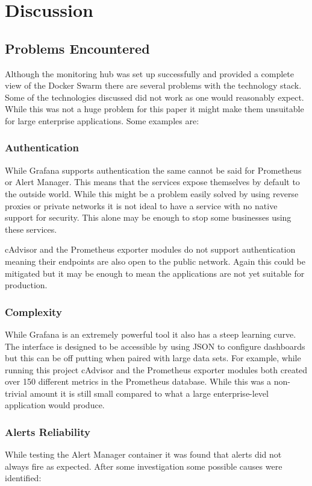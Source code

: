 \section{Discussion}
\label{sec:discussion}

\subsection{Problems Encountered}
Although the monitoring hub was set up successfully and provided a complete view of the Docker Swarm there are several problems with the technology stack. Some of the technologies discussed did not work as one would reasonably expect. While this was not a huge problem for this paper it might make them unsuitable for large enterprise applications. Some examples are:

\subsubsection{Authentication}
While Grafana supports authentication the same cannot be said for Prometheus or Alert Manager. This means that the services expose themselves by default to the outside world. While this might be a problem easily solved by using reverse proxies or private networks it is not ideal to have a service with no native support for security. This alone may be enough to stop some businesses using these services.

cAdvisor and the Prometheus exporter modules do not support authentication meaning their endpoints are also open to the public network. Again this could be mitigated but it may be enough to mean the applications are not yet suitable for production.

\subsubsection{Complexity}
While Grafana is an extremely powerful tool it also has a steep learning curve. The interface is designed to be accessible by using JSON to configure dashboards but this can be off putting when paired with large data sets. For example, while running this project cAdvisor and the Prometheus exporter modules both created over 150 different metrics in the Prometheus database. While this was a non-trivial amount it is still small compared to what a large enterprise-level application would produce. 

\subsubsection{Alerts Reliability}
While testing the Alert Manager container it was found that alerts did not always fire as expected. After some investigation some possible causes were identified:


